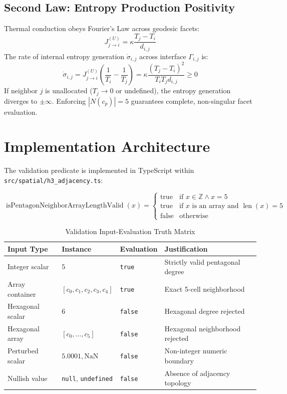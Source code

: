 \documentclass[11pt,a4paper]{article}
\theoremstyle{definition}
\begin{document}
\subsection{Second Law: Entropy Production Positivity}
Thermal conduction obeys Fourier's Law across geodesic facets:
\begin{equation}
J^{(U)}_{j \to i} = \kappa \frac{T_j - T_i}{d_{i,j}}
\end{equation}
The rate of internal entropy generation $\dot{\sigma}_{i,j}$ across interface $\Gamma_{i,j}$ is:
\begin{equation}
\dot{\sigma}_{i,j} = J^{(U)}_{j \to i} \left( \frac{1}{T_i} - \frac{1}{T_j} \right) = \kappa \frac{(T_j - T_i)^2}{T_i T_j d_{i,j}} \ge 0
\end{equation}
If neighbor $j$ is unallocated ($T_j \to 0$ or undefined), the entropy generation diverges to $\pm \infty$. Enforcing $|N(c_p)| = 5$ guarantees complete, non-singular facet evaluation.

\section{Implementation Architecture}

The validation predicate is implemented in TypeScript within \texttt{src/spatial/h3\_adjacency.ts}:

\begin{equation}
\operatorname{isPentagonNeighborArrayLengthValid}(x) = 
\begin{cases}
\mathrm{true} & \text{if } x \in \mathbb{Z} \land x = 5 \\
\mathrm{true} & \text{if } x \text{ is an array and } \operatorname{len}(x) = 5 \\
\mathrm{false} & \text{otherwise}
\end{cases}
\end{equation}

\begin{table}[h]
\centering
\small
\caption{Validation Input-Evaluation Truth Matrix}
\begin{tabular}{llll}
\toprule
\textbf{Input Type} & \textbf{Instance} & \textbf{Evaluation} & \textbf{Justification} \\
\midrule
Integer scalar & $5$ & \texttt{true} & Strictly valid pentagonal degree \\
Array container & $[c_0, c_1, c_2, c_3, c_4]$ & \texttt{true} & Exact 5-cell neighborhood \\
Hexagonal scalar & $6$ & \texttt{false} & Hexagonal degree rejected \\
Hexagonal array & $[c_0, \dots, c_5]$ & \texttt{false} & Hexagonal neighborhood rejected \\
Perturbed scalar & $5.0001, \mathrm{NaN}$ & \texttt{false} & Non-integer numeric boundary \\
Nullish value & \texttt{null}, \texttt{undefined} & \texttt{false} & Absence of adjacency topology \\
\bottomrule
\end{tabular}
\label{tab:evaluation_matrix}
\end{table}
\end{document}

